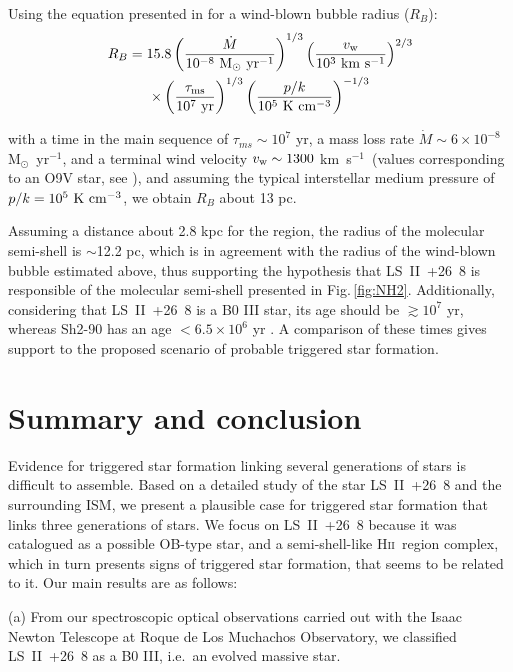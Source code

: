 \documentclass[fleqn,usenatbib]{mnras}
\def\hii{H\textsc{ii}}
\begin{document}
Using the equation presented in \citet{cheva99} for a wind-blown bubble radius ($R_{B}$):
\begin{multline}
R_{B} = 15.8\left(\frac{\dot{M}}{10^{-8}~\rm{M_{\odot}~yr^{-1}}}\right)^{1/3} \left(\frac{v_{\rm w}}{10^{3}~\rm{km~ s^{-1}}}\right)^{2/3} \\
\times \left(\frac{\tau_{\rm ms}}{10^{7}~\rm{yr}}\right)^{1/3} \left(\frac{p/k}{10^{5}~\rm{K~cm^{-3}}}\right)^{-1/3}    
\label{bubble}
\end{multline}

\noindent with a time in the main sequence of $\tau_{ms} \sim 10^{7}$ yr, a mass loss 
rate $\dot{M} \sim 6 \times 10^{-8}$ M$_{\odot}$~yr$^{-1}$, 
and a terminal wind velocity $v_{\rm w} \sim 1300$ km~s$^{-1}$~(values corresponding to an 
O9V star, see \citealt{kobul19,kobul18,chen13,cheva99}), and assuming the typical 
interstellar medium pressure of $p/k = 10^{5}~\rm{K~cm^{-3}}$, we obtain $R_{B}$ about 13 pc. 

Assuming a distance about 2.8 kpc for the region, the radius of the molecular semi-shell is 
$\sim$12.2 pc, which is in agreement with the radius of the wind-blown bubble estimated 
above, thus supporting the hypothesis that LS~II~+26~8 is responsible of the molecular semi-shell presented in Fig.\,\ref{fig:NH2}.
Additionally, considering that LS~II~+26~8 is a \textsc{B0 III} star, its age should be
 $\gtrsim 10^{7}$ yr, whereas Sh2-90 has an age $< 6.5 \times 10^{6}$ yr \citep{2014A&A...566A.122S}. 
A comparison of these times gives support to the proposed scenario of probable triggered star formation.


\section{Summary and conclusion}

Evidence for triggered star formation linking several generations of stars is difficult to assemble. 
Based on a detailed study of the star LS~II~+26~8 and the surrounding ISM, we present a plausible
case for triggered star formation that links three generations of stars. We focus on LS~II~+26~8 
because it was catalogued as a possible OB-type star, and a semi-shell-like \hii~region complex,
 which in turn presents signs of triggered star formation, that seems to be related to it.  
Our main results are as follows:

(a) From our spectroscopic optical observations carried out with the Isaac Newton Telescope 
at Roque de Los Muchachos Observatory, we classified LS~II~+26~8 as a B0 III, i.e.\ an evolved massive star.
\end{document}
